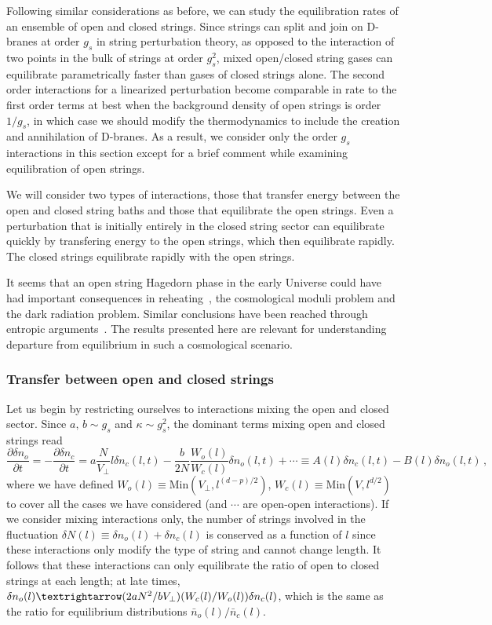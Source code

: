 \documentclass[a4paper,11pt]{article}
\begin{document}
{{{{{{{{{{{{Following similar considerations as before, we can study the equilibration rates of an ensemble of open and closed strings.
Since strings can split and join on D-branes at order $g_s$ in string 
perturbation theory, as opposed to the interaction of two points in the
bulk of strings at order $g_s^2$, mixed open/closed string gases can 
equilibrate parametrically faster than gases of closed strings alone.
The second order interactions for a linearized perturbation
become comparable in rate to the first order terms at best when the background
density of open strings is order $1/g_s$, in which case we should modify
the thermodynamics to include the creation and annihilation of D-branes.
As a result, we consider only the order $g_s$ interactions in this section
except for a brief comment while examining equilibration of open strings.

We will consider two types of interactions, those that transfer energy
between the open and closed string baths and those that equilibrate the open
strings. Even a perturbation that is initially entirely in the closed string
sector can equilibrate quickly by transfering energy to the open strings,
which then equilibrate rapidly. The closed strings equilibrate rapidly
with the open strings.

It seems that an open string Hagedorn phase in the early Universe could have had important consequences in reheating~\cite{Frey:2005jk}, the cosmological moduli problem and the dark radiation problem.
Similar conclusions have been reached through entropic arguments~\cite{Frey:2021jyo}. The results presented here are relevant for understanding departure
from equilibrium in such a cosmological scenario.


\subsubsection*{Transfer between open and closed strings}

Let us begin by restricting ourselves to interactions mixing the open and closed sector.
Since $a,\, b\sim g_s$ and $\kappa\sim g_s^2$, the dominant terms mixing open and closed strings read
\begin{equation}\label{eq:transfer}
    \frac{\partial \delta n_o}{\partial t}=-\frac{\partial \delta n_c}{\partial t}=a\frac{N}{V_\perp}l\delta n_c(l,t)-\frac{b}{2N}\frac{W_o(l)}{W_c (l)}\delta n_o(l,t)+\cdots\equiv A(l)\delta n_c(l,t)-B(l)\delta n_o(l,t)\, ,
\end{equation}
where we have defined $W_o(l)\equiv \text{Min}(V_\perp,l^{(d-p)/2})$, $W_c(l)\equiv \text{Min}(V,l^{d/2})$ to cover all the cases we have considered (and $\cdots$
are open-open interactions).
If we consider mixing interactions only, the number of strings involved in the fluctuation 
$\delta N(l)\equiv \delta n_o(l) + \delta n_c(l)$ is conserved as a function of
$l$ since these interactions only modify the type of string and cannot change
length. It follows that these interactions can only equilibrate the
ratio of open to closed strings at each length; at late times,
$\delta n_o(l)\textrightarrow (2aN^2/bV_\perp)(W_c(l)/W_o(l))\delta n_c(l)$, which is
the same as the ratio for equilibrium distributions $\bar n_o(l)/\bar n_c(l)$.

}}}}}}}}}}}}
\end{document}
